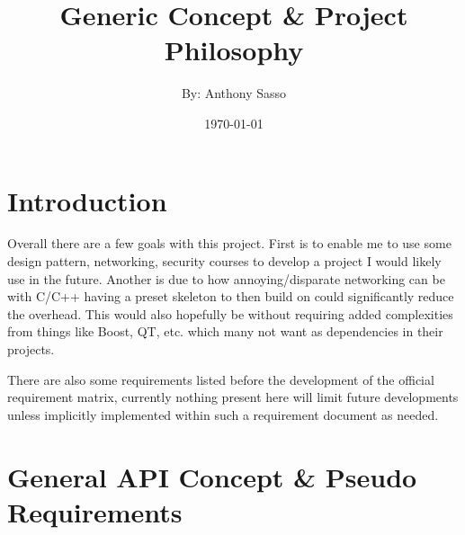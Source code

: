\documentclass{article}
\title      {\Huge Generic Concept \& Project Philosophy}
\author     {By: Anthony Sasso}
\date       {\today}
\begin{document}
\maketitle

\tableofcontents

\newpage
\section{Introduction}
Overall there are a few goals with this project. First is to enable me to use some design pattern, networking, security courses to develop a project I would likely use in the future. Another is due to how annoying/disparate networking can be with C/C++ having a preset skeleton to then build on could significantly reduce the overhead. This would also hopefully be without requiring added complexities from things like Boost, QT, etc. which many not want as dependencies in their projects.

There are also some requirements listed before the development of the official requirement matrix, currently nothing present here will limit future developments unless implicitly implemented within such a requirement document as needed.

\section{General API Concept \& Pseudo Requirements}
\end{document}
